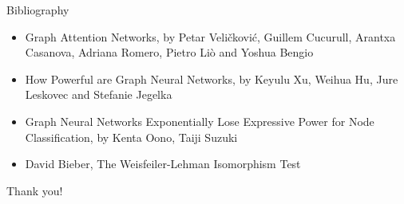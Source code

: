 \documentclass{beamer}
\theoremstyle{definition}
\begin{document}


\begin{frame}{Bibliography}
    \begin{itemize}
        \item Graph Attention Networks, by Petar Veličković, Guillem Cucurull, Arantxa Casanova, Adriana Romero, Pietro Liò and Yoshua Bengio
        \item How Powerful are Graph Neural Networks, by Keyulu Xu, Weihua Hu, Jure Leskovec and Stefanie Jegelka
        \item Graph Neural Networks Exponentially Lose Expressive Power for Node Classification, by Kenta Oono, Taiji Suzuki
        \item David Bieber, The Weisfeiler-Lehman Isomorphism Test
    \end{itemize}
\end{frame}

\begin{frame}{}
\centering
    \huge Thank you!
\end{frame}
\end{document}
